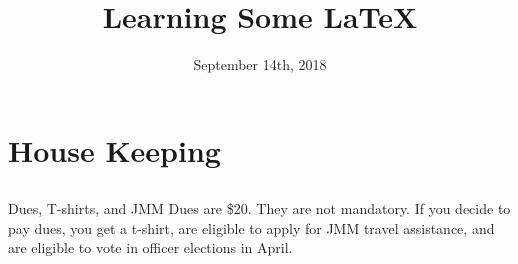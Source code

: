 \documentclass[xcolor=dvipsnames]{beamer}
\title[UCF Math Club Meeting 2]{Learning Some LaTeX}
\author{}
\institute{University of Central Florida}
\date{\scriptsize{September 14th, 2018}}
\begin{document}
\begin{frame}
  \titlepage
  \vfill
\end{frame}

\section{House Keeping}
\subsection{}

\begin{frame}{Dues, T-shirts, and JMM}
Dues are \$20. They are not mandatory. \newline
If you decide to pay dues, you get a t-shirt,  are eligible to apply for JMM travel assistance, and are eligible to vote in officer elections in April.\newline

\end{frame}
\end{document}
